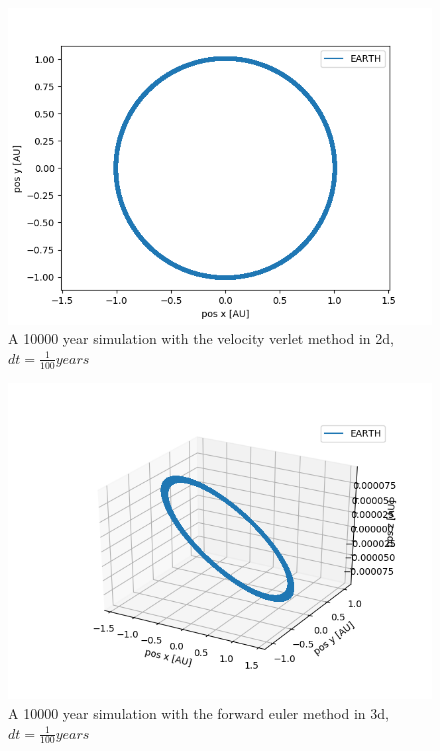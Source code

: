 \documentclass[a4paper]{article}
\begin{document}
	\begin{figure}[h!]
		\centering 
		\includegraphics[scale=0.7]{vv1e4_2d.png}
		\caption{A 10000 year simulation with the velocity verlet method in 2d, $dt = \frac{1}{100}years$}
		\label{vv2d}
	\end{figure}
	
	\begin{figure}[h!]
		\centering 
		\includegraphics[scale=0.7]{fe1e4_3d.png}
		\caption{A 10000 year simulation with the forward euler method in 3d, $dt = \frac{1}{100}years$}
		\label{fe3d}
	\end{figure}
	
\end{document}
